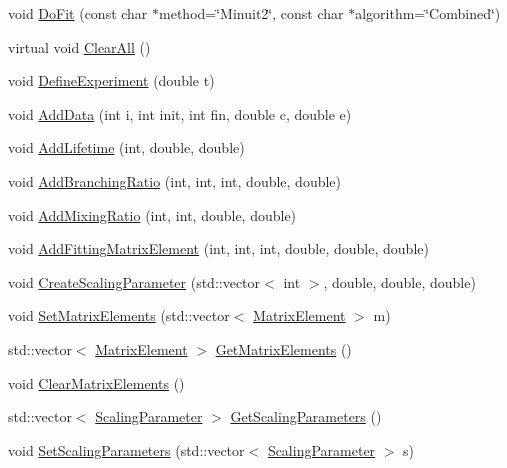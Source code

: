 \begin{DoxyCompactItemize}
\item 
void \hyperlink{classCoulExFitter_a08b4d7487381e52c0da70ab809e70fd4}{Do\-Fit} (const char $\ast$method=\char`\"{}Minuit2\char`\"{}, const char $\ast$algorithm=\char`\"{}Combined\char`\"{})
\item 
virtual void \hyperlink{classCoulExFitter_a3dc34ce26c8906acefada4da62ebe27f}{Clear\-All} ()
\item 
void \hyperlink{classCoulExFitter_adf6c8ef07257352eee65ad39eb900eb1}{Define\-Experiment} (double t)
\item 
void \hyperlink{classCoulExFitter_a81f503e2d4de8f39ad33b98327e5b8ab}{Add\-Data} (int i, int init, int fin, double c, double e)
\item 
void \hyperlink{classCoulExFitter_a5e2fa54175664c1ff80ec1562d7deb9d}{Add\-Lifetime} (int, double, double)
\item 
void \hyperlink{classCoulExFitter_a483e51a7fd5262d65b94f3d0e9d9a2b1}{Add\-Branching\-Ratio} (int, int, int, double, double)
\item 
void \hyperlink{classCoulExFitter_a6359add575cbb5eaa3f1f0a04a108643}{Add\-Mixing\-Ratio} (int, int, double, double)
\item 
void \hyperlink{classCoulExFitter_a8d2a0995d0d2239629e23810362177b8}{Add\-Fitting\-Matrix\-Element} (int, int, int, double, double, double)
\item 
void \hyperlink{classCoulExFitter_a5241e2d16d908fc409a2bd078846fa5e}{Create\-Scaling\-Parameter} (std\-::vector$<$ int $>$, double, double, double)
\item 
void \hyperlink{classCoulExFitter_a3ed4407b3cbd821bafc4aabc13dfd44a}{Set\-Matrix\-Elements} (std\-::vector$<$ \hyperlink{classMatrixElement}{Matrix\-Element} $>$ m)
\item 
std\-::vector$<$ \hyperlink{classMatrixElement}{Matrix\-Element} $>$ \hyperlink{classCoulExFitter_ae866bffb9fe2ef25c03e79cedd1357a8}{Get\-Matrix\-Elements} ()
\item 
void \hyperlink{classCoulExFitter_a3e300781a246a5f162a8c12b1d1d5461}{Clear\-Matrix\-Elements} ()
\item 
std\-::vector$<$ \hyperlink{classScalingParameter}{Scaling\-Parameter} $>$ \hyperlink{classCoulExFitter_a1eeaeb97c9f1133f1d8140bee0deddad}{Get\-Scaling\-Parameters} ()
\item 
void \hyperlink{classCoulExFitter_a900b2c3070ea11e65c6ce6753d50f644}{Set\-Scaling\-Parameters} (std\-::vector$<$ \hyperlink{classScalingParameter}{Scaling\-Parameter} $>$ s)

\end{DoxyCompactItemize}
